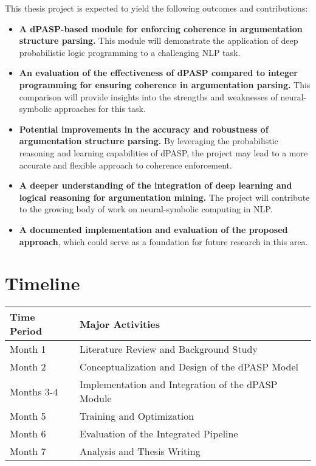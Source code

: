 \documentclass{article}
\begin{document}
This thesis project is expected to yield the following outcomes and
contributions:

\begin{itemize}
    \item \textbf{A dPASP-based module for enforcing coherence in argumentation
    structure parsing.} This module will demonstrate the application of deep
    probabilistic logic programming to a challenging NLP task.

    \item \textbf{An evaluation of the effectiveness of dPASP compared to
    integer programming for ensuring coherence in argumentation parsing.} This
    comparison will provide insights into the strengths and weaknesses of
    neural-symbolic approaches for this task.

    \item \textbf{Potential improvements in the accuracy and robustness of
    argumentation structure parsing.} By leveraging the probabilistic reasoning
    and learning capabilities of dPASP, the project may lead to a more accurate
    and flexible approach to coherence enforcement.

    \item \textbf{A deeper understanding of the integration of deep learning and
    logical reasoning for argumentation mining.} The project will contribute to
    the growing body of work on neural-symbolic computing in NLP.

    \item \textbf{A documented implementation and evaluation of the proposed
    approach}, which could serve as a foundation for future research in this
    area.
\end{itemize}

\section{Timeline}

\begin{tabular}{|l|l|}
\hline
\textbf{Time Period} & \textbf{Major Activities} \\
\hline
Month 1 & Literature Review and Background Study \\
\hline
Month 2 & Conceptualization and Design of the dPASP Model \\
\hline
Months 3-4 & Implementation and Integration of the dPASP Module \\
\hline
Month 5 & Training and Optimization \\
\hline
Month 6 & Evaluation of the Integrated Pipeline \\
\hline
Month 7 & Analysis and Thesis Writing \\
\hline
\end{tabular}
\end{document}
